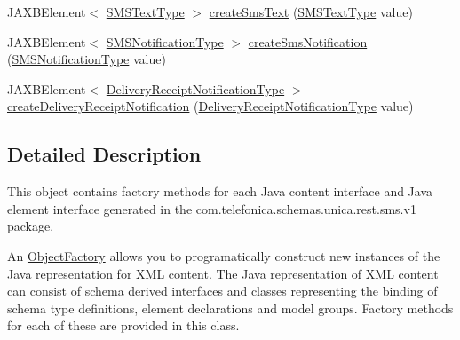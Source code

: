 \begin{DoxyCompactItemize}
\item 
JAXBElement$<$ \hyperlink{classcom_1_1telefonica_1_1schemas_1_1unica_1_1rest_1_1sms_1_1v1_1_1SMSTextType}{SMSTextType} $>$ \hyperlink{classcom_1_1telefonica_1_1schemas_1_1unica_1_1rest_1_1sms_1_1v1_1_1ObjectFactory_a6b9f77f8474bbdefcdd72ace4b2e4837}{createSmsText} (\hyperlink{classcom_1_1telefonica_1_1schemas_1_1unica_1_1rest_1_1sms_1_1v1_1_1SMSTextType}{SMSTextType} value)
\item 
JAXBElement$<$ \hyperlink{classcom_1_1telefonica_1_1schemas_1_1unica_1_1rest_1_1sms_1_1v1_1_1SMSNotificationType}{SMSNotificationType} $>$ \hyperlink{classcom_1_1telefonica_1_1schemas_1_1unica_1_1rest_1_1sms_1_1v1_1_1ObjectFactory_a996927e5d79b07e96a6f59f7d46fac00}{createSmsNotification} (\hyperlink{classcom_1_1telefonica_1_1schemas_1_1unica_1_1rest_1_1sms_1_1v1_1_1SMSNotificationType}{SMSNotificationType} value)
\item 
JAXBElement$<$ \hyperlink{classcom_1_1telefonica_1_1schemas_1_1unica_1_1rest_1_1sms_1_1v1_1_1DeliveryReceiptNotificationType}{DeliveryReceiptNotificationType} $>$ \hyperlink{classcom_1_1telefonica_1_1schemas_1_1unica_1_1rest_1_1sms_1_1v1_1_1ObjectFactory_a5d8421f4b53a1b85f39c69d8f7281e4c}{createDeliveryReceiptNotification} (\hyperlink{classcom_1_1telefonica_1_1schemas_1_1unica_1_1rest_1_1sms_1_1v1_1_1DeliveryReceiptNotificationType}{DeliveryReceiptNotificationType} value)
\end{DoxyCompactItemize}


\subsection{Detailed Description}
This object contains factory methods for each Java content interface and Java element interface generated in the com.telefonica.schemas.unica.rest.sms.v1 package. 

An \hyperlink{classcom_1_1telefonica_1_1schemas_1_1unica_1_1rest_1_1sms_1_1v1_1_1ObjectFactory}{ObjectFactory} allows you to programatically construct new instances of the Java representation for XML content. The Java representation of XML content can consist of schema derived interfaces and classes representing the binding of schema type definitions, element declarations and model groups. Factory methods for each of these are provided in this class. 

